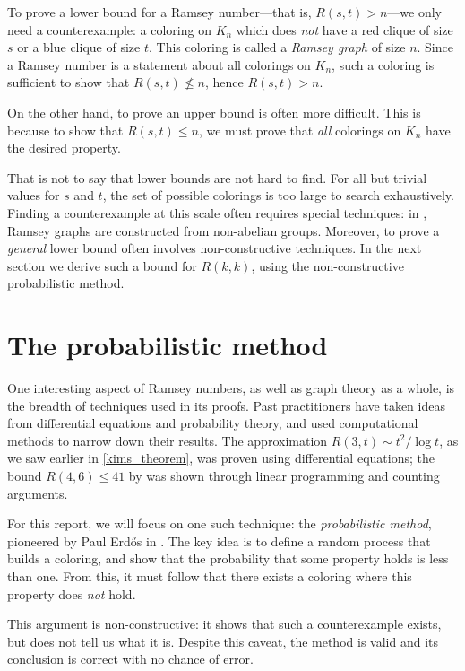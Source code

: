 \documentclass{article}
\begin{document}
To prove a lower bound for a Ramsey number---that is, $R(s,t) > n$---we only need a counterexample: a coloring on $K_n$ which does \emph{not} have a red clique of size $s$ or a blue clique of size $t$. This coloring is called a \textit{Ramsey graph} of size $n$. Since a Ramsey number is a statement about all colorings on $K_n$, such a coloring is sufficient to show that $R(s,t) \nleq n$, hence $R(s,t) > n$.

On the other hand, to prove an upper bound is often more difficult. This is because to show that $R(s,t) \leq n$, we must prove that \emph{all} colorings on $K_n$ have the desired property.

That is not to say that lower bounds are not hard to find. For all but trivial values for $s$ and $t$, the set of possible colorings is too large to search exhaustively. Finding a counterexample at this scale often requires special techniques: in \citet{exoo2004some}, Ramsey graphs are constructed from non-abelian groups. Moreover, to prove a \emph{general} lower bound often involves non-constructive techniques. In the next section we derive such a bound for $R(k,k)$, using the non-constructive probabilistic method.

\section{The probabilistic method}

One interesting aspect of Ramsey numbers, as well as graph theory as a whole, is the breadth of techniques used in its proofs. Past practitioners have taken ideas from differential equations and probability theory, and used computational methods to narrow down their results. The approximation $R(3,t) \sim t^2/\log t$, as we saw earlier in \cref{kims_theorem}, was proven using differential equations; the bound $R(4,6) \leq 41$ by \citet{mckay1997subgraph} was shown through linear programming and counting arguments.

For this report, we will focus on one such technique: the \textit{probabilistic method}, pioneered by Paul Erdős in \citeyear{erdos1947some}. The key idea is to define a random process that builds a coloring, and show that the probability that some property holds is less than one. From this, it must follow that there exists a coloring where this property does \emph{not} hold.

This argument is non-constructive: it shows that such a counterexample exists, but does not tell us what it is. Despite this caveat, the method is valid and its conclusion is correct with no chance of error.
\end{document}
